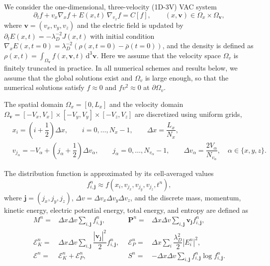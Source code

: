 \documentclass[preprint,1p,times]{elsarticle}
\theoremstyle{definition}
\theoremstyle{remark}
\begin{document}
We consider the one-dimensional, three-velocity (1D-3V) VAC system
\begin{equation}
    \partial_{t} f + v_{x} \nabla_{x} f + E(x,t)\,\nabla_{v_{x}} f = C[f], \qquad (x,\bm{v}) \in \Omega_{x} \times \Omega_{\bm{v}},
\end{equation}
where $\bm{v} = (v_{x}, v_{y}, v_{z})$ and the electric field is updated by $\partial_{t} E(x,t) = - \lambda_{D}^{-2} J(x,t)$ with initial condition $\nabla_{x} E(x,t=0) = \lambda_{D}^{-2} (\rho(x,t=0) - \bar{\rho}(t=0))$, and the density is defined as $\rho(x,t) = \int_{\Omega_{\bm{v}}} f(x,\bm{v},t)\,\mathrm{d}^{3}\bm{v}$.
Here we assume that the velocity space $\Omega_{v}$ is finitely truncated in practice.
In all numerical schemes and results below, we assume that the global solutions exist and $\Omega_{v}$ is large enough, so that the numerical solutions satisfy $f\approx0$ and $f v^{2}\approx 0$ at $\partial \Omega_{v}$.

The spatial domain $\Omega_{x}=[0,L_{x}]$ and the velocity domain $\Omega_{\bm{v}}=[-V_{x},V_{x}]\times[-V_{y},V_{y}]\times[-V_{z},V_{z}]$ are discretized using uniform grids,
\begin{equation}
    \begin{aligned}
        &x_{i} = \left(i+\dfrac{1}{2}\right)\Delta x, \qquad i=0,\ldots,N_{x}-1, \qquad \Delta x = \dfrac{L_{x}}{N_{x}}, \\
        &v_{j_{\alpha}} = -V_{\alpha} + \left(j_{\alpha}+\dfrac{1}{2}\right)\Delta v_{\alpha}, \qquad j_{\alpha}=0,\ldots,N_{v_{\alpha}}-1, \qquad \Delta v_{\alpha} = \dfrac{2V_{\alpha}}{N_{v_{\alpha}}}, \quad \alpha\in\{x,y,z\}.
    \end{aligned}
\end{equation}

The distribution function is approximated by its cell-averaged values
\begin{equation}
    f^{n}_{i,\bm{j}} \approx f(x_{i},v_{j_{x}},v_{j_{y}},v_{j_{z}},t^{n}),
\end{equation}
where $\bm{j}=(j_{x},j_{y},j_{z})$, $\Delta v = \Delta v_{x}\Delta v_{y}\Delta v_{z}$, and the discrete mass, momentum, kinetic energy, electric potential energy, total energy, and entropy are defined as
\begin{equation}\label{eq:MPE}
    \begin{aligned}
        M^{n} =& \Delta x \Delta v \sum_{i,\bm{j}} f_{i,\bm{j}}^{n}, ~~ &\bm{P}^{n} =& \Delta x \Delta v \sum_{i,\bm{j}} \bm{v}_{\bm{j}} f_{i,\bm{j}}^{n}, \\
        \mathcal{E}_{K}^{n} =& \Delta x \Delta v \sum_{i,\bm{j}} \dfrac{|\bm{v}_{\bm{j}}|^{2}}{2} f_{i,\bm{j}}^{n}, ~~ &\mathcal{E}_{P}^{n} =& \Delta x \sum_{i} \dfrac{\lambda_{D}^{2}}{2} |E_{i}^{n}|^{2} , \\
        \mathcal{E}^{n} =& \mathcal{E}_{K}^{n} + \mathcal{E}_{P}^{n}, ~~ &S^{n} =& - \Delta x \Delta v \sum_{i,\bm{j}} f_{i,\bm{j}}^{n} \log f_{i,\bm{j}}^{n} .
    \end{aligned}
\end{equation}
\end{document}
